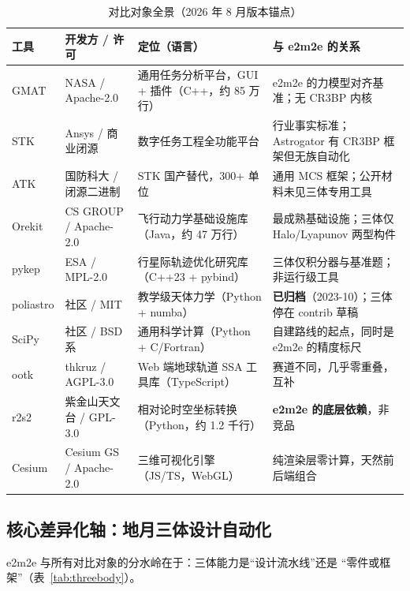 \begin{table}[htbp]
\centering\footnotesize
\caption{对比对象全景（2026 年 8 月版本锚点）}
\label{tab:landscape}
\begin{tabularx}{\textwidth}{@{}llXX@{}}
\toprule
\textbf{工具} & \textbf{开发方 / 许可} & \textbf{定位（语言）} & \textbf{与 e2m2e 的关系} \\
\midrule
GMAT & NASA / Apache-2.0 & 通用任务分析平台，GUI + 插件（C++，约 85 万行） &
e2m2e 的力模型对齐基准；无 CR3BP 内核 \\
STK & Ansys / 商业闭源 & 数字任务工程全功能平台 &
行业事实标准；Astrogator 有 CR3BP 框架但无族自动化 \\
ATK & 国防科大 / 闭源二进制 & STK 国产替代，300+ 单位 &
通用 MCS 框架；公开材料未见三体专用工具 \\
Orekit & CS GROUP / Apache-2.0 & 飞行动力学基础设施库（Java，约 47 万行） &
最成熟基础设施；三体仅 Halo/Lyapunov 两型构件 \\
pykep & ESA / MPL-2.0 & 行星际轨迹优化研究库（C++23 + pybind） &
三体仅积分器与基准题；非运行级工具 \\
poliastro & 社区 / MIT & 教学级天体力学（Python + numba） &
\textbf{已归档}（2023-10）；三体停在 contrib 草稿 \\
SciPy & 社区 / BSD 系 & 通用科学计算（Python + C/Fortran） &
自建路线的起点，同时是 e2m2e 的精度标尺 \\
ootk & thkruz / AGPL-3.0 & Web 端地球轨道 SSA 工具库（TypeScript） &
赛道不同，几乎零重叠，互补 \\
r2s2 & 紫金山天文台 / GPL-3.0 & 相对论时空坐标转换（Python，约 1.2 千行） &
\textbf{e2m2e 的底层依赖}，非竞品 \\
Cesium & Cesium GS / Apache-2.0 & 三维可视化引擎（JS/TS，WebGL） &
纯渲染层零计算，天然前后端组合 \\
\bottomrule
\end{tabularx}
\end{table}

\subsection{核心差异化轴：地月三体设计自动化}
\label{subsec:three-body-axis}

e2m2e 与所有对比对象的分水岭在于：三体能力是``设计流水线''还是
``零件或框架''（表~\ref{tab:threebody}）。


